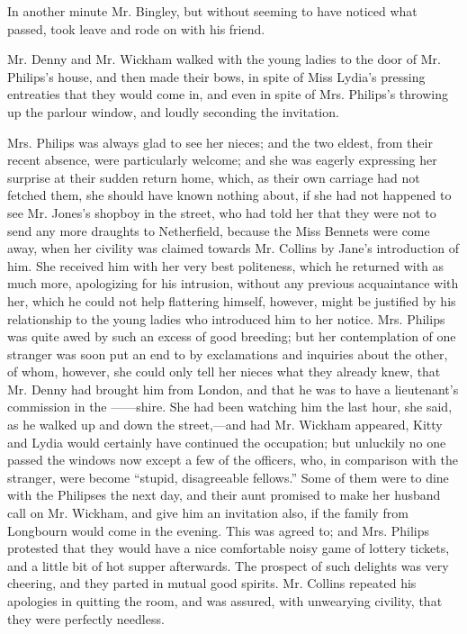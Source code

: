 \documentclass[12pt]{book}
\begin{document}
In another minute Mr. Bingley, but without seeming to have noticed what passed, took leave and rode on with his friend.

Mr. Denny and Mr. Wickham walked with the young ladies to the door of Mr. Philips's house, and then made their bows, in spite of Miss Lydia's pressing entreaties that they would come in, and even in spite of Mrs. Philips's throwing up the parlour window, and loudly seconding the invitation.

Mrs. Philips was always glad to see her nieces; and the two eldest, from their recent absence, were particularly welcome; and she was eagerly expressing her surprise at their sudden return home, which, as their own carriage had not fetched them, she should have known nothing about, if she had not happened to see Mr. Jones's shopboy in the street, who had told her that they were not to send any more draughts to Netherfield, because the Miss Bennets were come away, when her civility was claimed towards Mr. Collins by Jane's introduction of him. She received him with her very best politeness, which he returned with as much more, apologizing for his intrusion, without any previous acquaintance with her, which he could not help flattering himself, however, might be justified by his relationship to the young ladies who introduced him to her notice. Mrs. Philips was quite awed by such an excess of good breeding; but her contemplation of one stranger was soon put an end to by exclamations and inquiries about the other, of whom, however, she could only tell her nieces what they already knew, that Mr. Denny had brought him from London, and that he was to have a lieutenant's commission in the ------shire. She had been watching him the last hour, she said, as he walked up and down the street,---and had Mr. Wickham appeared, Kitty and Lydia would certainly have continued the occupation; but unluckily no one passed the windows now except a few of the officers, who, in comparison with the stranger, were become ``stupid, disagreeable fellows.'' Some of them were to dine with the Philipses the next day, and their aunt promised to make her husband call on Mr. Wickham, and give him an invitation also, if the family from Longbourn would come in the evening. This was agreed to; and Mrs. Philips protested that they would have a nice comfortable noisy game of lottery tickets, and a little bit of hot supper afterwards. The prospect of such delights was very cheering, and they parted in mutual good spirits. Mr. Collins repeated his apologies in quitting the room, and was assured, with unwearying civility, that they were perfectly needless.
\end{document}
